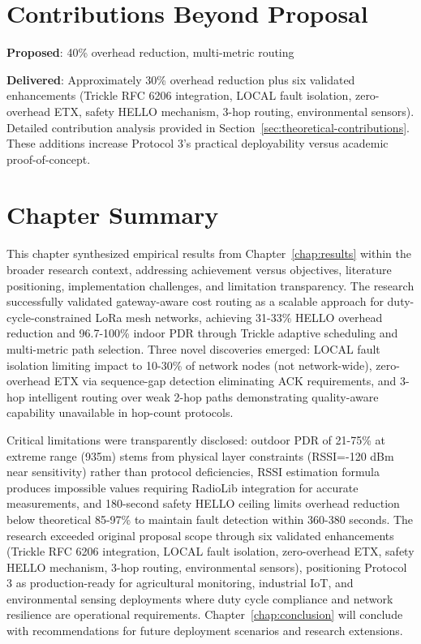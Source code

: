 \section{Contributions Beyond Proposal}

\textbf{Proposed}: 40\% overhead reduction, multi-metric routing

\textbf{Delivered}: Approximately 30\% overhead reduction plus six validated enhancements (Trickle RFC 6206 integration, LOCAL fault isolation, zero-overhead ETX, safety HELLO mechanism, 3-hop routing, environmental sensors). Detailed contribution analysis provided in Section~\ref{sec:theoretical-contributions}. These additions increase Protocol 3's practical deployability versus academic proof-of-concept.

\section{Chapter Summary}

This chapter synthesized empirical results from Chapter~\ref{chap:results} within the broader research context, addressing achievement versus objectives, literature positioning, implementation challenges, and limitation transparency. The research successfully validated gateway-aware cost routing as a scalable approach for duty-cycle-constrained LoRa mesh networks, achieving 31-33\% HELLO overhead reduction and 96.7-100\% indoor PDR through Trickle adaptive scheduling and multi-metric path selection. Three novel discoveries emerged: LOCAL fault isolation limiting impact to 10-30\% of network nodes (not network-wide), zero-overhead ETX via sequence-gap detection eliminating ACK requirements, and 3-hop intelligent routing over weak 2-hop paths demonstrating quality-aware capability unavailable in hop-count protocols.

Critical limitations were transparently disclosed: outdoor PDR of 21-75\% at extreme range (935m) stems from physical layer constraints (RSSI=-120 dBm near sensitivity) rather than protocol deficiencies, RSSI estimation formula produces impossible values requiring RadioLib integration for accurate measurements, and 180-second safety HELLO ceiling limits overhead reduction below theoretical 85-97\% to maintain fault detection within 360-380 seconds. The research exceeded original proposal scope through six validated enhancements (Trickle RFC 6206 integration, LOCAL fault isolation, zero-overhead ETX, safety HELLO mechanism, 3-hop routing, environmental sensors), positioning Protocol 3 as production-ready for agricultural monitoring, industrial IoT, and environmental sensing deployments where duty cycle compliance and network resilience are operational requirements. Chapter~\ref{chap:conclusion} will conclude with recommendations for future deployment scenarios and research extensions.
